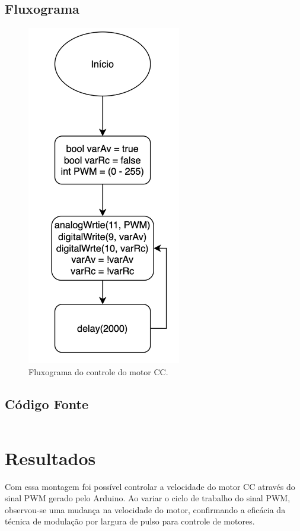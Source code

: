 \documentclass[12pt, a4paper]{article}
\begin{document}
\subsection{Fluxograma}
\begin{figure}[H]
	\centering
	\includegraphics[width=0.6\textwidth]{fluxograma_trabalho_04.png}
	\caption{Fluxograma do controle do motor CC.}
	\label{fig:fluxograma_aula05}
\end{figure}

\subsection{Código Fonte}

\begin{mybox}[label={lst:codigo_servidor},title={Código}]{}
	\inputminted[fontsize=\footnotesize,breaklines,linenos]{cpp}{./arduino/main.ino}
\end{mybox}
\newpage
\section{Resultados}
Com essa montagem foi possível controlar a velocidade do motor CC através do sinal PWM gerado pelo Arduino. Ao variar o ciclo de trabalho do sinal PWM, observou-se uma mudança na velocidade do motor, confirmando a eficácia da técnica de modulação por largura de pulso para controle de motores.
\end{document}
